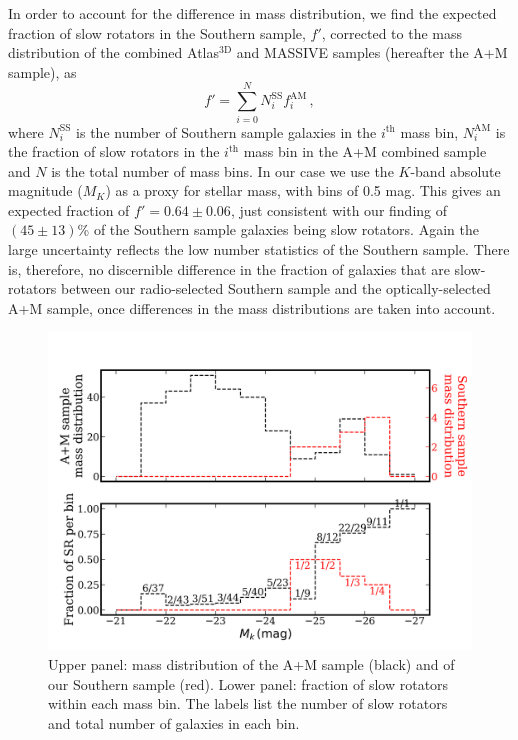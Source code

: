 \documentclass[a4paper,fleqn,usenatbib]{mnras}
\begin{document}
		In order to account for the difference in mass distribution, we find the expected fraction of slow rotators in the Southern sample, $f'$, corrected to the mass distribution of the combined Atlas$^\text{3D}$ and MASSIVE samples (hereafter the A+M sample), as
		\begin{equation}
			f' = \sum_{i=0}^N N^\text{SS}_i f^\text{AM}_i \, , 
		\end{equation}
		where $N^\text{SS}_i$ is the number of Southern sample galaxies in the $i^\text{th}$ mass bin, $N^\text{AM}_i$ is the fraction of slow rotators in the $i^\text{th}$ mass bin in the A+M combined sample and $N$ is the total number of mass bins. In our case we use the $K$-band absolute magnitude ($M_K$) as a proxy for stellar mass, with bins of 0.5 mag. This gives an expected fraction of $f' = 0.64 \pm 0.06$, just consistent with our finding of $(45\pm13)$\% of the Southern sample galaxies being slow rotators. Again the large uncertainty reflects the low number statistics of the Southern sample. There is, therefore, no discernible difference in the fraction of galaxies that are slow-rotators between our radio-selected Southern sample and the optically-selected A+M sample, once differences in the mass distributions are taken into account. 

		\begin{figure}
			\includegraphics[width=\columnwidth]{M_k_binned.png}
			\caption{Upper panel: mass distribution of the A+M sample (black) and of our Southern sample (red). Lower panel: fraction of slow rotators within each mass bin. The labels list the number of slow rotators and total number of galaxies in each bin.}
			\label{fig:SRmassFraction}
		\end{figure}
\end{document}
